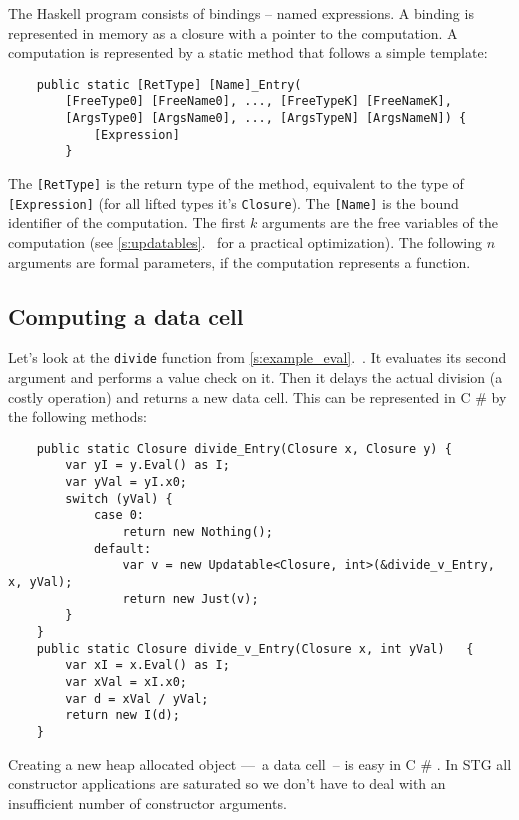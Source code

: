 \documentclass[en]{pracamgr}
\newcommand{\shrp}{%
  {\fontfamily{ppl}\selectfont\#%
  }}
\newcommand{\myref}[1]{\ref{#1}.~\textit{\nameref{#1}}}
\begin{document}
The Haskell program consists of bindings -- named expressions.
A binding is represented in memory as a closure with a pointer to the computation.
A computation is represented by a static method that follows a simple template:

\begin{verbatim}
    public static [RetType] [Name]_Entry(
        [FreeType0] [FreeName0], ..., [FreeTypeK] [FreeNameK],
        [ArgsType0] [ArgsName0], ..., [ArgsTypeN] [ArgsNameN]) {
            [Expression]
        }
\end{verbatim}

The \verb|[RetType]| is the return type of the method,
equivalent to the type of \verb|[Expression]|
(for all lifted types it's \texttt{Closure}).
The \verb|[Name]| is the bound identifier of the computation.
The first $k$ arguments are the free variables of the computation
(see \myref{s:updatables} for a practical optimization).
The following $n$ arguments are formal parameters, if the computation represents a function.

\subsection{Computing a data cell}\label{s:compute_data}

Let's look at the \texttt{divide} function from \myref{s:example_eval}.
It evaluates its second argument and performs a value check on it.
Then it delays the actual division (a costly operation) and returns a new data cell.
This can be represented in C\shrp{} by the following methods:

\begin{verbatim}
    public static Closure divide_Entry(Closure x, Closure y) {
        var yI = y.Eval() as I;
        var yVal = yI.x0;
        switch (yVal) {
            case 0:
                return new Nothing();
            default:
                var v = new Updatable<Closure, int>(&divide_v_Entry, x, yVal);
                return new Just(v);
        }
    }
    public static Closure divide_v_Entry(Closure x, int yVal)   {
        var xI = x.Eval() as I;
        var xVal = xI.x0;
        var d = xVal / yVal;
        return new I(d);
    }
\end{verbatim}

Creating a new heap allocated object ––~a data cell~--
is easy in C\shrp{}. In STG all constructor applications are
saturated so we don't have to deal with an
insufficient number of constructor arguments.
\end{document}
